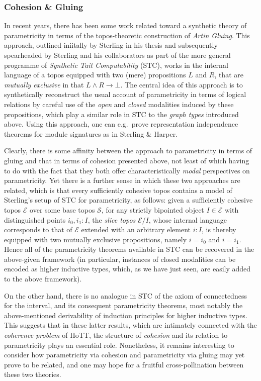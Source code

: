 \documentclass[
  12pt]{article}
\begin{document}
\subsubsection{Cohesion \& Gluing}\label{cohesion-gluing}

In recent years, there has been some work related toward a synthetic
theory of parametricity in terms of the topos-theoretic construction of
\emph{Artin Gluing}. This approach, outlined iniitally by Sterling in
his thesis and subsequently spearheaded by Sterling and his
collaborators as part of the more general programme of \emph{Synthetic
Tait Computability} (STC), works in the internal language of a topos
equipped with two (mere) propositions \(L\) and \(R\), that are
\emph{mutually exclusive} in that \(L \wedge R \to \bot\). The central
idea of this approach is to synthetically reconstruct the usual account
of parametricity in terms of logical relations by careful use of the
\emph{open} and \emph{closed} modalities induced by these propositions,
which play a similar role in STC to the \emph{graph types} introduced
above. Using this approach, one can e.g.~prove representation
independence theorems for module signatures as in Sterling \& Harper.

Clearly, there is some affinity between the approach to parametricity in
terms of gluing and that in terms of cohesion presented above, not least
of which having to do with the fact that they both offer
characteristically \emph{modal} perspectives on parametricity. Yet there
is a further sense in which these two approaches are related, which is
that every sufficiently cohesive topos contains a model of Sterling's
setup of STC for parametricity, as follows: given a sufficiently
cohesive topos \(\mathcal{E}\) over some base topos \(\mathcal{S}\), for
any strictly bipointed object \(I \in \mathcal{E}\) with distinguished
points \(i_0, i_1 : I\), the \emph{slice topos} \(\mathcal{E}/I\), whose
internal language corresponds to that of \(\mathcal{E}\) extended with
an arbitrary element \(i : I\), is thereby equipped with two mutually
exclusive propositions, namely \(i = i_0\) and \(i = i_1\). Hence all of
the parametricity theorems available in STC can be recovered in the
above-given framework (in particular, instances of closed modalities can
be encoded as higher inductive types, which, as we have just seen, are
easily added to the above framework).

On the other hand, there is no analogue in STC of the axiom of
connectedness for the interval, and its consequent parametricity
theorems, most notably the above-mentioned derivability of induction
principles for higher inductive types. This suggests that in these
latter results, which are intimately connected with the \emph{coherence
problem} of HoTT, the structure of \emph{cohesion} and its relation to
parametricity plays an essential role. Nonetheless, it remains
interesting to consider how parametricity via cohesion and parametricity
via gluing may yet prove to be related, and one may hope for a fruitful
cross-pollination between these two theories.
\end{document}
